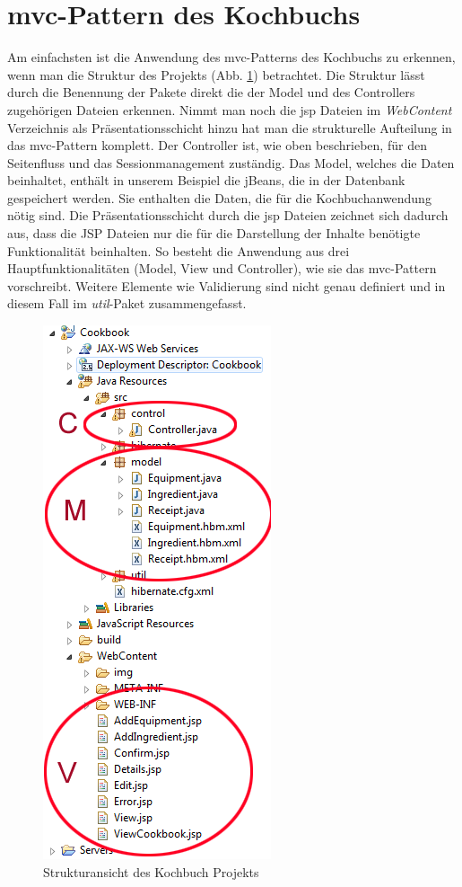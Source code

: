 \section{\acrshort{mvc}-Pattern des Kochbuchs}
Am einfachsten ist die Anwendung des \acrshort{mvc}-Patterns des Kochbuchs zu erkennen, wenn man die Struktur des Projekts (Abb. \ref{jsp_mvc}) betrachtet. Die Struktur lässt durch die Benennung der Pakete direkt die der Model und des Controllers zugehörigen Dateien erkennen. Nimmt man noch die \acrshort{jsp} Dateien im \textit{WebContent} Verzeichnis als Präsentationsschicht hinzu hat man die strukturelle Aufteilung in das \acrshort{mvc}-Pattern komplett.
Der Controller ist, wie oben beschrieben, für den Seitenfluss und das Sessionmanagement zuständig.
Das Model, welches die Daten beinhaltet, enthält in unserem Beispiel die jBeans, die in der Datenbank gespeichert werden. Sie enthalten die Daten, die für die Kochbuchanwendung nötig sind.
Die Präsentationsschicht durch die \acrshort{jsp} Dateien zeichnet sich dadurch aus, dass die JSP Dateien nur die für die Darstellung der Inhalte benötigte Funktionalität beinhalten. So besteht die Anwendung aus drei Hauptfunktionalitäten (Model, View und Controller), wie sie das \acrshort{mvc}-Pattern vorschreibt. Weitere Elemente wie Validierung sind nicht genau definiert und in diesem Fall im \textit{util}-Paket zusammengefasst.
\begin{figure}[htbp]
    \centering
    \includegraphics[scale=1]{images/mvc.png}
    \caption{Strukturansicht des Kochbuch Projekts}
    \label{jsp_mvc}
\end{figure}

